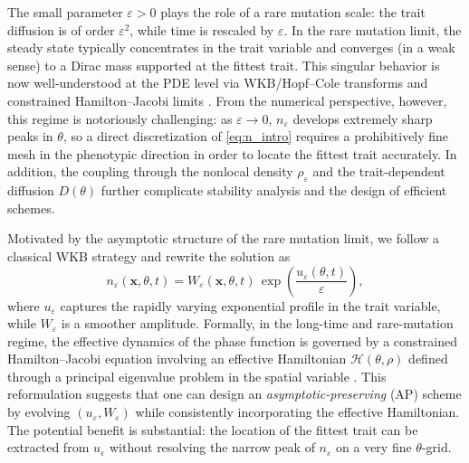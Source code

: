 \documentclass[11pt, dina4, amsfont12]{article}
\begin{document}
The small parameter $\varepsilon>0$ plays the role of a rare mutation scale: the
trait diffusion is of order $\varepsilon^2$, while time is rescaled by $\varepsilon$.
In the rare mutation limit, the steady state typically concentrates in the trait
variable and converges (in a weak sense) to a Dirac mass supported at the fittest
trait. This singular behavior is now well-understood at the PDE level via
WKB/Hopf--Cole transforms and constrained Hamilton--Jacobi limits
\cite{PerthameSouganidis,BarlesPerthame,MirrahimiPerthame}.
From the numerical perspective, however, this regime is notoriously challenging:
as $\varepsilon\to0$, $n_\varepsilon$ develops extremely sharp peaks in $\theta$,
so a direct discretization of \eqref{eq:n_intro} requires a prohibitively fine mesh
in the phenotypic direction in order to locate the fittest trait accurately. In
addition, the coupling through the nonlocal density $\rho_\varepsilon$ and the
trait-dependent diffusion $D(\theta)$ further complicate stability analysis and
the design of efficient schemes.

Motivated by the asymptotic structure of the rare mutation limit, we follow a
classical WKB strategy and rewrite the solution as
\[
n_\varepsilon(\mathbf{x},\theta,t)
=
W_\varepsilon(\mathbf{x},\theta,t)\,
\exp\!\left(\frac{u_\varepsilon(\theta,t)}{\varepsilon}\right),
\]
where $u_\varepsilon$ captures the rapidly varying exponential profile in the
trait variable, while $W_\varepsilon$ is a smoother amplitude. Formally, in the
long-time and rare-mutation regime, the effective dynamics of the phase function
is governed by a constrained Hamilton--Jacobi equation involving an effective
Hamiltonian $\mathcal H(\theta,\rho)$ defined through a principal eigenvalue
problem in the spatial variable \cite{PerthameSouganidis,AlmeidaPerthameRuan}.
This reformulation suggests that one can design an \emph{asymptotic-preserving}
(AP) scheme by evolving $(u_\varepsilon,W_\varepsilon)$ while consistently
incorporating the effective Hamiltonian. The potential benefit is substantial:
the location of the fittest trait can be extracted from $u_\varepsilon$ without
resolving the narrow peak of $n_\varepsilon$ on a very fine $\theta$-grid.
\end{document}
